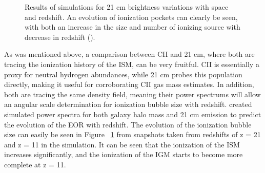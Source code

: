 \documentclass[manuscript]{aastex}
\begin{document}
\begin{figure}[H]
	\centering
	\qquad
	\singlespace
	\caption[21 cm brightness maps for different redshifts. -(\cite{Santos2010})]{Results of simulations for 21 cm brightness variations with space and redshift. An evolution of ionization pockets can clearly be seen, with both an increase in the size and number of ionizing source with decrease in redshift (\cite{Santos2010}).}%
	\label{fig:santos1}%
\end{figure}

As was mentioned above, a comparison between CII and 21 cm, where both are tracing the ionization history of the ISM, can be very fruitful. CII is essentially a proxy for neutral hydrogen abundances, while 21 cm probes this population directly, making it useful for corroborating CII gas mass estimates. In addition, both are tracing the same density field, meaning their power spectrums will allow an angular scale determination for ionization bubble size with redshift. \cite{Santos2010} created simulated power spectra for both galaxy halo mass and 21 cm emission to predict the evolution of the EOR with redshift. The evolution of the ionization bubble size can easily be seen in Figure ~\ref{fig:santos1} from snapshots taken from redshifts of z = 21 and z = 11 in the simulation. It can be seen that the ionization of the ISM increases significantly, and the ionization of the IGM starts to become more complete at z = 11. 
\end{document}
